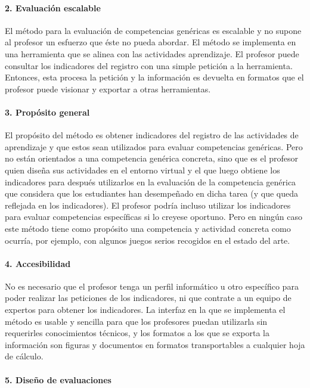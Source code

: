 \paragraph*{2. Evaluación escalable}

El método para la evaluación de competencias genéricas es escalable y no supone al profesor un esfuerzo que éste no pueda abordar. El método se implementa en una herramienta que se alinea con las actividades aprendizaje. El profesor puede consultar los indicadores del registro con una simple petición a la herramienta. Entonces, esta procesa la petición y la información es devuelta en formatos que el profesor puede visionar y exportar a otras herramientas.

\paragraph*{3. Propósito general}

El propósito del método es obtener indicadores del registro de las actividades de aprendizaje y que estos sean utilizados para evaluar competencias genéricas. Pero no están orientados a una competencia genérica concreta, sino que es el profesor quien diseña sus actividades en el entorno virtual y el que luego obtiene los indicadores para después utilizarlos en la evaluación de la competencia genérica que considera que los estudiantes han desempeñado en dicha tarea (y que queda reflejada en los indicadores). El profesor podría incluso utilizar los indicadores para evaluar competencias específicas si lo creyese oportuno. Pero en ningún caso este método tiene como propósito una competencia y actividad concreta como ocurría, por ejemplo, con algunos juegos serios recogidos en el estado del arte.

\paragraph*{4. Accesibilidad}

No es necesario que el profesor tenga un perfil informático u otro específico para poder realizar las peticiones de los indicadores, ni que contrate a un equipo de expertos para obtener los indicadores. La interfaz en la que se implementa el método es usable y sencilla para que los profesores puedan utilizarla sin requerirles conocimientos técnicos, y los formatos a los que se exporta la información son figuras y documentos en formatos transportables a cualquier hoja de cálculo.

\paragraph*{5. Diseño de evaluaciones}


